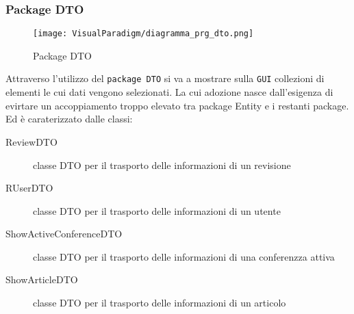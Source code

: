 \subsubsection{Package DTO}

\label{sec:package_dto_prg_image}
\begin{figure}[H]
  \centering
  \texttt{[image: VisualParadigm/diagramma\_prg\_dto.png]}
  \caption{Package DTO}
  \label{fig:Package DTO}
\end{figure}

Attraverso l'utilizzo del \texttt{package DTO} si va a mostrare sulla \texttt{GUI} collezioni di elementi le cui dati vengono selezionati. La cui adozione nasce dall'esigenza di evirtare un accoppiamento troppo elevato tra package Entity e i restanti package. Ed è caraterizzato dalle classi:
\begin{description}
\item[ReviewDTO] classe DTO per il trasporto delle informazioni di un revisione
\item[RUserDTO] classe DTO per il trasporto delle informazioni di un utente
\item[ShowActiveConferenceDTO] classe DTO per il trasporto delle informazioni di una conferenzza attiva
\item[ShowArticleDTO] classe DTO per il trasporto delle informazioni di un articolo
\end{description}
